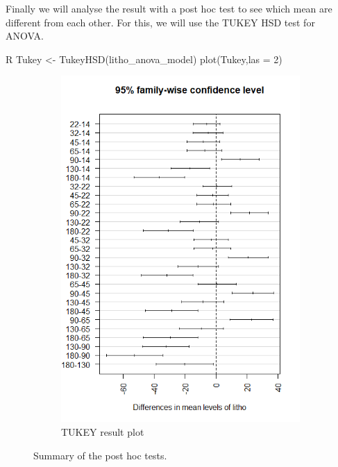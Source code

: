 Finally we will analyse the result with a post hoc test to see which mean are different from each other. For this, we will use the TUKEY HSD test for ANOVA.

\begin{code}{R}
    Tukey <- TukeyHSD(litho_anova_model)
    plot(Tukey,las = 2)
\end{code}
\newpage

\begin{figure}[htbp]
    \centering

    \begin{subfigure}[b]{0.45\textwidth}
        \centering
        \includegraphics[width=\textwidth]{./graphics/TUKEY HSD confidence.png}
        \caption{TUKEY result plot}
        \label{fig:TUKEYconfidence}
    \end{subfigure}
    \caption{Summary of the post hoc tests.}
\end{figure}
    

